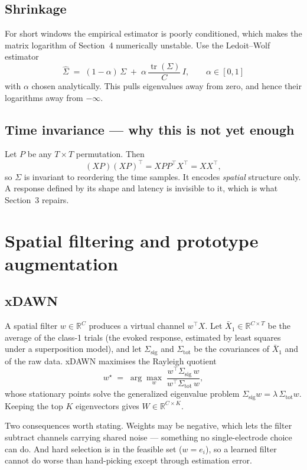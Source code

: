 \documentclass[11pt]{article}
\newcommand{\Real}{\mathbb{R}}
\newcommand{\Tr}{\operatorname{tr}}
\begin{document}
\subsection{Shrinkage}

For short windows the empirical estimator is poorly conditioned, which
makes the matrix logarithm of Section~4 numerically unstable. Use the
Ledoit--Wolf estimator
\[
\hat\Sigma \;=\; (1-\alpha)\,\Sigma \;+\; \alpha\,\frac{\Tr(\Sigma)}{C}\, I,
\qquad \alpha \in [0,1]
\]
with $\alpha$ chosen analytically. This pulls eigenvalues away from
zero, and hence their logarithms away from $-\infty$.

\subsection{Time invariance --- why this is not yet enough}

Let $P$ be any $T \times T$ permutation. Then
\[
(XP)(XP)^\top = X P P^\top X^\top = X X^\top ,
\]
so $\Sigma$ is invariant to reordering the time samples. It encodes
\emph{spatial} structure only. A response defined by its shape and
latency is invisible to it, which is what Section~3 repairs.

\section{Spatial filtering and prototype augmentation}

\subsection{xDAWN}

A spatial filter $w \in \Real^C$ produces a virtual channel $w^\top X$.
Let $\bar{X}_1 \in \Real^{C\times T}$ be the average of the class-1
trials (the evoked response, estimated by least squares under a
superposition model), and let $\Sigma_{\text{sig}}$ and
$\Sigma_{\text{tot}}$ be the covariances of $\bar{X}_1$ and of the raw
data. xDAWN maximises the Rayleigh quotient
\[
w^\star \;=\; \arg\max_{w}\;
\frac{w^\top \Sigma_{\text{sig}} \, w}{w^\top \Sigma_{\text{tot}}\, w},
\]
whose stationary points solve the generalized eigenvalue problem
$\Sigma_{\text{sig}} w = \lambda \, \Sigma_{\text{tot}} w$. Keeping the
top $K$ eigenvectors gives $W \in \Real^{C \times K}$.

Two consequences worth stating. Weights may be negative, which lets the
filter subtract channels carrying shared noise --- something no
single-electrode choice can do. And hard selection is in the feasible
set ($w = e_i$), so a learned filter cannot do worse than hand-picking
except through estimation error.
\end{document}
